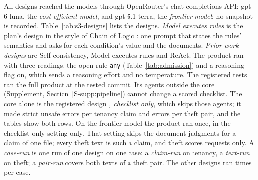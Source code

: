 \label{sec:configuration}
All designs reached the models through OpenRouter's chat-completions API: gpt-6-luna, the \emph{cost-efficient model}, and gpt-6.1-terra, the \emph{frontier model}; no snapshot is recorded. Table~\ref{tab:s3-designs} lists the designs. \emph{Model executes rules} is the plan's design in the style of Chain of Logic \cite{servantez2024chain}: one prompt that states the rules' semantics and asks for each condition's value and the documents. \emph{Prior-work designs} are Self-consistency, Model executes rules and ReAct. The product ran with three readings, the open rule \texttt{any} (Table~\ref{tab:admission}) and a reasoning flag on, which sends a reasoning effort and no temperature. The registered tests ran the full product at the tested commit. Its agents outside the core (Supplement, Section~\ref{S-supp:pipeline}) cannot change a scored checklist. The core alone is the registered design \emph{\casepath, checklist only}, which skips those agents; it made \sthreeChecklistTenStrict{} strict unsafe errors per tenancy claim and \sthreeChecklistThErrors{} errors per theft pair, and the tables show both rows. On the frontier model the product ran once, in the checklist-only setting only. That setting skips the document judgments for a claim of one file; every theft text is such a claim, and theft scores requests only. A \emph{case-run} is one run of one design on one case: a \emph{claim-run} on tenancy, a \emph{text-run} on theft; a \emph{pair-run} covers both texts of a theft pair. The other designs ran \sthreeCasePathTenRuns{} times per case.

